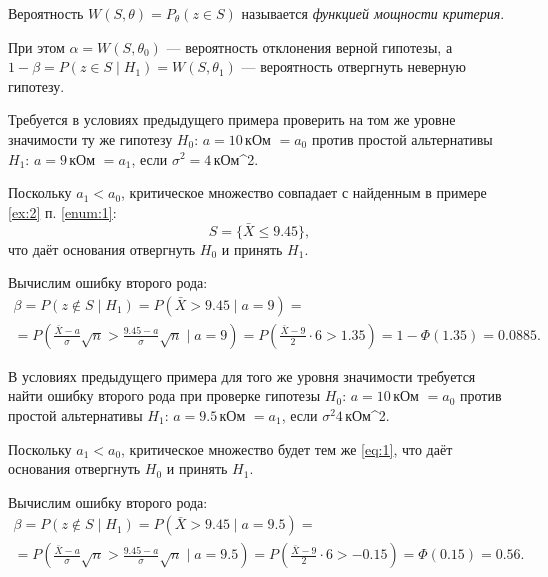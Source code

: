\begin{definition}
Вероятность $W(S, \theta) = P_\theta(z\in S)$ называется \emph{функцией мощности
критерия}.
\end{definition}

При этом $ \alpha = W(S, \theta_0) $ --- вероятность отклонения верной гипотезы,
а $ 1-\beta = P(z \in S \mid H_1) = W(S, \theta_1) $ --- вероятность отвергнуть
неверную гипотезу.

\begin{ex}
	Требуется в условиях предыдущего примера проверить на том же уровне значимости
	ту же гипотезу $ H_0 $: $ a = 10 $\,кОм $ = a_0 $ против простой альтернативы
	$ H_1 $: $ a = 9 $\,кОм $ = a_1 $, если $ \sigma^2 = 4 $\,кОм^2. 
	\begin{solution}
		Поскольку $ a_1 < a_0 $, критическое множество совпадает с найденным в
		примере \ref{ex:2} п. \ref{enum:1}:  
		\begin{equation}\label{eq:1}
			S = \{\bar X \leqslant 9.45\},
		\end{equation}
		что даёт основания отвергнуть $ H_0 $ и принять $ H_1 $. 

		Вычислим ошибку	второго рода: 
		\begin{multline*}
				\beta = P(z \notin S \mid H_1) = P(\bar X > 9.45 \mid a = 9) =\\= P \left(
				\frac{\bar X - a}{\sigma}\sqrt n > \frac{9.45 - a}{\sigma}\sqrt n \mid a
			= 9\right) = P \left( \frac{\bar X - 9}{2} \cdot 6 > 1.35 \right) = 1 -
			\Phi(1.35) = 0.0885.
		\end{multline*}

	\end{solution}
\end{ex}
\begin{ex}
	В условиях предыдущего примера для того же уровня значимости требуется найти
	ошибку второго рода при проверке гипотезы $ H_0 $: $ a =10 $\,кОм $ = a_0 $
	против простой альтернативы $ H_1 $: $ a = 9.5 $\,кОм $ = a_1 $, если $
	\sigma^2 4 $\,кОм^2.
	\begin{solution}
		Поскольку $ a_1 < a_0 $, критическое множество будет тем же \eqref{eq:1},
		что даёт основания отвергнуть $ H_0 $ и принять $ H_1 $.

		Вычислим ошибку второго рода: 
		\begin{multline*}
				\beta = P(z\notin S\mid H_1) = P(\bar X > 9.45 \mid a = 9.5) =\\=
				P \left(
				\frac{\bar X - a}{\sigma}\sqrt n> \frac{9.45 - a}{\sigma} \sqrt n\mid a
			= 9.5\right) = P \left( \frac{\bar X - 9}{2}\cdot 6 > -0.15 \right) =
			\Phi(0.15) = 0.56.
		\end{multline*}
	\end{solution}	
\end{ex}
